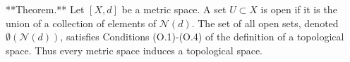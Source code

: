 **Theorem.** Let $[X, d]$ be a metric space. A set $U \subset X$ is open if it is the union of a collection of elements of $\mathcal{N}(d)$. The set of all open sets, denoted $\emptyset(\mathcal{N}(d))$, satisfies Conditions (O.1)-(O.4) of the definition of a topological space. Thus every metric space induces a topological space.
